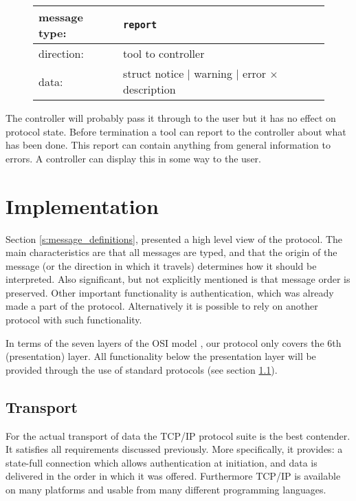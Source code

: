 \documentclass{article}
\newcommand{\msg}[1]{\texttt{#1}}
\begin{document}
   \begin{figure}[H]
    \begin{center}
     \begin{tabular}{|ll|}
      \hline
       message type:   & \msg{report} \\
      \hline
       direction:      & tool to controller \\
       data:           & struct notice $|$ warning $|$ error $\times$ description \\
      \hline
     \end{tabular}
    \end{center}
   \end{figure}
   \vspace{-0.7cm}
   \noindent The controller will probably pass it through to the user but
   it has no effect on protocol state. Before termination a tool can report to
   the controller about what has been done. This report can contain anything
   from general information to errors. A controller can display this in some
   way to the user.

 \section{Implementation} \label{s:protocol_implementation}

   Section \ref{s:message_definitions}, presented a high level view of the
   protocol. The main characteristics are that all messages are typed, and that
   the origin of the message (or the direction in which it travels) determines
   how it should be interpreted. Also significant, but not explicitly mentioned
   is that message order is preserved. Other important functionality is
   authentication, which was already made a part of the protocol.
   Alternatively it is possible to rely on another protocol with such
   functionality.

   In terms of the seven layers of the OSI model \cite{Day1983}, our protocol
   only covers the 6th (presentation) layer. All functionality below the
   presentation layer will be provided through the use of standard protocols
   (see section \ref{ss:transport}).
   
  \subsection{Transport} \label{ss:transport}

   For the actual transport of data the TCP/IP protocol suite is the best
   contender. It satisfies all requirements discussed previously. More
   specifically, it provides: a state-full connection which allows
   authentication at initiation, and data is delivered in the order in which it
   was offered.  Furthermore TCP/IP is available on many platforms and usable
   from many different programming languages.
\end{document}
